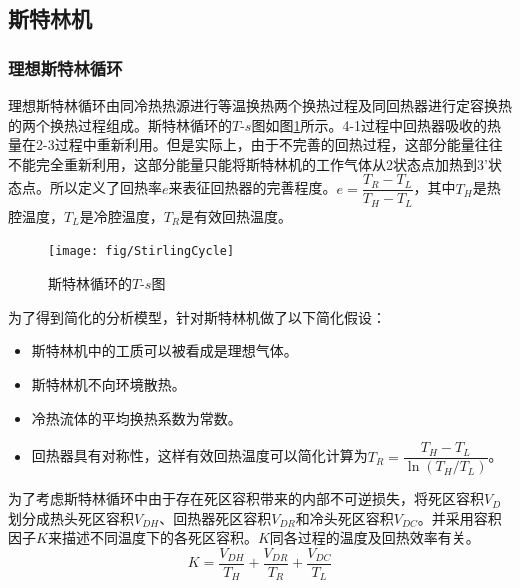 \subsection{斯特林机}
\label{sec:StirlingEngineModel}
\subsubsection{理想斯特林循环}
理想斯特林循环由同冷热热源进行等温换热两个换热过程及同回热器进行定容换热的两个换热过程组成。斯特林循环的$T$-$s$图如图\ref{fig:StirlingCycle}所示。4-1过程中回热器吸收的热量在2-3过程中重新利用。但是实际上，由于不完善的回热过程，这部分能量往往不能完全重新利用，这部分能量只能将斯特林机的工作气体从2状态点加热到3'状态点。所以定义了回热率$e$来表征回热器的完善程度\cite{Formosa2010,Juhasz2010}。$e=\dfrac{T_R-T_L}{T_H-T_L}$，其中$T_H$是热腔温度，$T_L$是冷腔温度，$T_R$是有效回热温度。

\noindent \begin{figure}[htbp]
\begin{center}
	\texttt{[image: fig/StirlingCycle]}
	\caption{斯特林循环的$T$-$s$图}
	\label{fig:StirlingCycle}
\end{center}
\end{figure}

为了得到简化的分析模型，针对斯特林机做了以下简化假设：

\begin{itemize}
\item 斯特林机中的工质可以被看成是理想气体。
\item 斯特林机不向环境散热。
\item 冷热流体的平均换热系数为常数。
\item 回热器具有对称性，这样有效回热温度可以简化计算为$T_{R}=\dfrac{T_{H}-T_{L}}{\ln(T_{H}/T_{L})}$\cite{Formosa2010,Juhasz2010}。
\end{itemize}

为了考虑斯特林循环中由于存在死区容积带来的内部不可逆损失，将死区容积$V_D$划分成热头死区容积$V_{DH}$、回热器死区容积$V_{DR}$和冷头死区容积$V_{DC}$\cite{Duan2014}。并采用容积因子$K$来描述不同温度下的各死区容积。$K$同各过程的温度及回热效率有关。
\begin{equation}
	K = \frac{V_{DH}}{T_H} + \frac{V_{DR}}{T_R} + \frac{V_{DC}}{T_L}
\end{equation}

